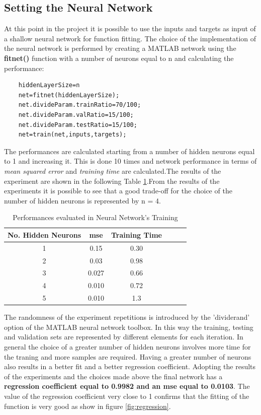 \documentclass{article}
\begin{document}
\subsection{Setting the Neural Network} 
At this point in the project it is possible to use the inputs and targets as input of a shallow neural network for function fitting.
The choice of the implementation of the neural network is performed by creating a MATLAB network using the \textbf{fitnet()} function with a number of neurons equal to n and calculating the performance:
\begin{verbatim}
	hiddenLayerSize=n 
	net=fitnet(hiddenLayerSize);
	net.divideParam.trainRatio=70/100;
	net.divideParam.valRatio=15/100; 
	net.divideParam.testRatio=15/100; 
	net=train(net,inputs,targets);
\end{verbatim}
The performances are calculated starting from a number of hidden neurons equal to 1 and increasing it. This is done 10 times and network performance in terms of \textit{mean squared error} and \textit{training time} are calculated.The results of the experiment are shown in the following Table \ref{tab:tablefitnn}.From the results of the experiments it is possible to see that a good trade-off for the choice of the number of hidden neurons is represented by n = 4. 
\begin{table}[h!]
  \begin{center}
    \label{tab:tablefitnn}
    \begin{tabular}{c|c|c|c|c|c} 
      \textbf{No. Hidden Neurons} & \textbf{mse}&\textbf{Training Time}\\
       \hline
     1 	 &0.15	&0.30\\
     2	 &0.03&	0.98\\
     3	 &0.027	 &0.66\\
     4	 &0.010	 &0.72\\
     5	 &0.010& 1.3\\
    \end{tabular}
    \caption{Performances evaluated in Neural Network's Training}
  \end{center}
\end{table}
The randomness of the experiment repetitions is introduced by the 'dividerand' option of the MATLAB neural network toolbox. In this way the training, testing and validation sets are represented by different elements for each iteration. In general the choice of a greater number of hidden neurons involves more time for the traning and more samples are required. Having a greater number of neurons also results in a better fit and a better regression coefficient.
Adopting the results of the experiments and the choices made above the final network has a \textbf{regression coefficient equal to 0.9982 and an mse equal to 0.0103}. The value of the regression coefficient very close to 1 confirms that the fitting of the function is very good as show in figure \ref{fig:regression}.
\end{document}
